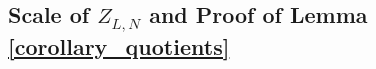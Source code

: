 \documentclass[pdflatex,sn-mathphys-num]{sn-jnl}%
\theoremstyle{thmstyleone}%
\theoremstyle{thmstyletwo}%
\theoremstyle{thmstylethree}%
\begin{document}
	
	
	
	

\subsection{Scale of $Z_{L,N}$ and Proof of Lemma \ref{corollary_quotients}}
\end{document}

